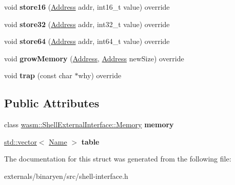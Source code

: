 \begin{DoxyCompactItemize}
void {\bfseries store16} (\mbox{\hyperlink{structwasm_1_1_address}{Address}} addr, int16\+\_\+t value) override
\item 
\mbox{\label{structwasm_1_1_shell_external_interface_a756e02232c36b28233171b963af2cd4a}} 
void {\bfseries store32} (\mbox{\hyperlink{structwasm_1_1_address}{Address}} addr, int32\+\_\+t value) override
\item 
\mbox{\label{structwasm_1_1_shell_external_interface_af2803d56efef0f7f56a91f6d72e8975e}} 
void {\bfseries store64} (\mbox{\hyperlink{structwasm_1_1_address}{Address}} addr, int64\+\_\+t value) override
\item 
\mbox{\label{structwasm_1_1_shell_external_interface_a54ad32df30c6a5b039e9dea91316d813}} 
void {\bfseries grow\+Memory} (\mbox{\hyperlink{structwasm_1_1_address}{Address}}, \mbox{\hyperlink{structwasm_1_1_address}{Address}} new\+Size) override
\item 
\mbox{\label{structwasm_1_1_shell_external_interface_a8ae9bf2a0563288b6cd95da80abc6e76}} 
void {\bfseries trap} (const char $\ast$why) override
\end{DoxyCompactItemize}
\subsection*{Public Attributes}
\begin{DoxyCompactItemize}
\item 
\mbox{\label{structwasm_1_1_shell_external_interface_a4cfbdd0195f481a57e991d5524a971b2}} 
class \mbox{\hyperlink{classwasm_1_1_shell_external_interface_1_1_memory}{wasm\+::\+Shell\+External\+Interface\+::\+Memory}} {\bfseries memory}
\item 
\mbox{\label{structwasm_1_1_shell_external_interface_a6659d6f758f2b6e27a9b0b70444e0c19}} 
\mbox{\hyperlink{classstd_1_1vector}{std\+::vector}}$<$ \mbox{\hyperlink{structwasm_1_1_name}{Name}} $>$ {\bfseries table}
\end{DoxyCompactItemize}


The documentation for this struct was generated from the following file\+:\begin{DoxyCompactItemize}
\item 
externals/binaryen/src/shell-\/interface.\+h\end{DoxyCompactItemize}
